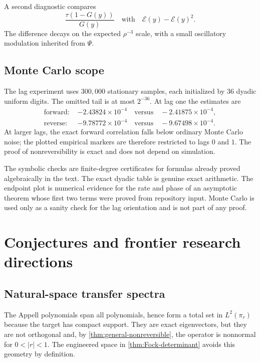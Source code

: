 \documentclass[11pt,a4paper]{article}
\theoremstyle{definition}
\theoremstyle{remark}
\begin{document}
A second diagnostic compares
\begin{equation}
 \frac{\tau(1-G(y))}{G(y)}
 \quad\text{with}\quad
 \mathcal E(y)-\mathcal E(y)^2.
 \label{eq:Watson-diagnostic}
\end{equation}
The difference decays on the expected $\rho^{-3}$ scale, with a small oscillatory modulation inherited from $\Psi$.

\subsection{Monte Carlo scope}

The lag experiment uses $300{,}000$ stationary samples, each initialized by $36$ dyadic uniform digits. The omitted tail is at most $2^{-36}$. At lag one the estimates are
\begin{align*}
 \text{forward: }&-2.43824\times10^{-4}
 \quad\text{versus}\quad -2.41875\times10^{-4},\\
 \text{reverse: }&-9.78772\times10^{-4}
 \quad\text{versus}\quad -9.67498\times10^{-4}.
\end{align*}
At larger lags, the exact forward correlation falls below ordinary Monte Carlo noise; the plotted empirical markers are therefore restricted to lags $0$ and $1$. The proof of nonreversibility is exact and does not depend on simulation.

\begin{cautionbox}
The symbolic checks are finite-degree certificates for formulas already proved algebraically in the text. The exact dyadic table is genuine exact arithmetic. The endpoint plot is numerical evidence for the rate and phase of an asymptotic theorem whose first two terms were proved from repository input. Monte Carlo is used only as a sanity check for the lag orientation and is not part of any proof.
\end{cautionbox}

\section{Conjectures and frontier research directions}
\label{sec:conjectures}

\subsection{Natural-space transfer spectra}

The Appell polynomials span all polynomials, hence form a total set in $L^2(\pi_r)$ because the target has compact support. They are exact eigenvectors, but they are not orthogonal and, by \cref{thm:general-nonreversible}, the operator is nonnormal for $0<|r|<1$. The engineered space in \cref{thm:Fock-determinant} avoids this geometry by definition.
\end{document}
